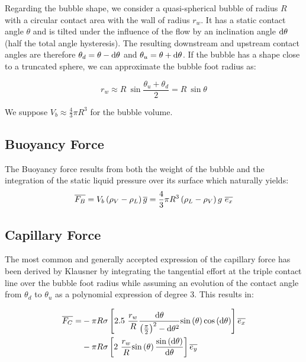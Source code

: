 Regarding the bubble shape, we consider a quasi-spherical bubble of radius $R$ with a circular contact area with the wall of radius $r_{w}$. It has a static contact angle $\theta$ and is tilted under the influence of the flow by an inclination angle $\mathrm{d}\theta$ (half the total angle hysteresis). The resulting downstream and upstream contact angles are therefore $\theta_{d}=\theta-\mathrm{d}\theta$ and $\theta_{u}=\theta+\mathrm{d}\theta$. If the bubble has a shape close to a truncated sphere, we can approximate the bubble foot radius as:

\begin{equation}
r_{w} \approx R~ \sin{\frac{\theta_{u}+\theta_{d}}{2}}=R~ \sin{\theta}
\label{eq:rw}
\end{equation}

We suppose $V_{b}\approx\frac{4}{3}\pi R^{3}$ for the bubble volume.

\subsection{Buoyancy Force}

The Buoyancy force results from both the weight of the bubble and the integration of the static liquid pressure over its surface which naturally yields:
\begin{equation}
\label{eq:buoyancy}
\overline{F_{B}}=V_{b}\left( \rho_{V}-\rho_{L} \right)\overline{g}=\frac{4}{3}\pi R^{3}\left( \rho_{L}-\rho_{V} \right)g \ \overline{e_{x}}
\end{equation}

\subsection{Capillary Force}\label{subsec:FC}

The most common and generally accepted expression of the capillary force has been derived by Klausner \cite{klausner_vapor_1993} by integrating the tangential effort at the triple contact line over the bubble foot radius while assuming an evolution of the contact angle from $\theta_{d}$ to $\theta_{u}$ as a polynomial expression of degree 3. This results in:

\begin{align}
\nonumber \vect{F_{C}}=&-\pi R \sigma \crocht{2.5~ \frac{r_{w}}{R} \frac{\dtheta}{\parth{\frac{\pi}{2}}^{2}-\dtheta^{2}}\sin{\theta}\cos{\dtheta}} \vect{e_{x}}\\
%
& - \pi R \sigma \crocht{2\ \frac{r_{w}}{R} \sin{\theta} \frac{\sin{\dtheta}}{\dtheta}}\vect{e_{y}}
\label{eq:FC_klausner}
\end{align}


